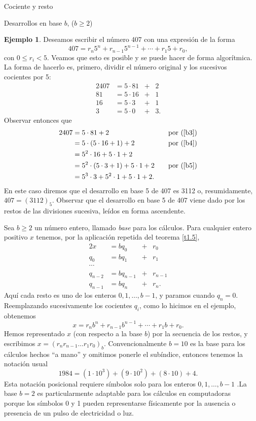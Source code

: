 \documentclass[11pt,spanish,makeidx]{amsbook}
\theoremstyle{definition}
\newtheorem{ejemplo}{Ejemplo}[section]
\theoremstyle{remark}
\begin{document}
\begin{section}{Cociente y resto}
\begin{subsection}{Desarrollos en base $b$, ($b \ge 2$)}
\begin{ejemplo} Deseamos escribir el número 407 con una expresión de la forma 
$$
407 = r_n5^n +r_{n-1} 5^{n-1}+\cdots + r_1 5 + r_0,
$$
con $0 \le r_i < 5$. Veamos que esto es posible y se puede hacer de forma algorítmica. La forma de hacerlo  es, primero, dividir el número original y los sucesivos cocientes por 5:  
\begin{alignat}2
407 &=5\cdot 81 &+& 2 \label{b3}\\
81 & = 5\cdot 16 &+& 1  \label{b4}\\
16 & = 5\cdot 3 &+& 1  \label{b5}\\
3 & = 5\cdot 0 &+& 3.
\end{alignat}
Observar entonces que
\begin{alignat*}2
407 &=5\cdot 81 + 2  &\quad& \text{por (\ref{b3})}\\
 &= 5\cdot (5\cdot 16 + 1) + 2  &\quad& \text{por (\ref{b4})}\\
 &= 5^2 \cdot 16+ 5\cdot 1 + 2 &\quad& \text{}\\
 &= 5^2 \cdot (5\cdot 3 + 1)+ 5\cdot 1 + 2   &\quad& \text{por (\ref{b5})}\\
 &= 5^3 \cdot 3+ 5^2 \cdot 1 + 5\cdot 1 + 2.  &\quad& \text{}
\end{alignat*}
En este caso diremos que el desarrollo en base 5 de 407 es 3112 o, resumidamente, $407 = (3112)_5$.  Observar que el desarrollo en base 5 de 407 viene dado por los restos de las divisiones sucesiva, leídos en forma ascendente.
\end{ejemplo}

Sea $b \ge 2$ un número entero, llamado {\em base} para los cálculos. Para cualquier entero positivo $x$ tenemos, por la aplicación repetida del teorema \ref{t1.5},
\begin{alignat*}2
x&=bq_0 &+& r_0 \\
q_0 & = bq_1 &+&r_1 \\
\cdots & \\
q_{n-2} & = bq_{n-1} &+&r_{n-1} \\
q_{n-1} & = bq_n &+&r_n.
\end{alignat*}
Aquí cada resto es uno de los enteros $0, 1,\ldots,b-1$, y paramos cuando $q_n=0$. Reemplazando sucesivamente los cocientes $q_i$, como lo hicimos en el ejemplo, obtenemos
$$
x=r_nb^n +r_{n-1} b^{n-1}+\cdots + r_1 b + r_0.
$$
Hemos representado $x$ (con respecto a la base $b$) por la secuencia de los restos, y escribimos $x=(r_nr_{n-1}\dots r_1 r_0)_b$. Convencionalmente $b=10$ es la base para los cálculos hechos ``a mano'' y omitimos ponerle el subíndice, entonces tenemos la notación usual
$$
1984=(1\cdot 10^3 ) + (9\cdot 10^2 )+(8\cdot 10 ) + 4.
$$
Esta notación posicional requiere símbolos solo para los enteros $0, 1,\ldots,b-1$ .La base $b=2$ es particularmente adaptable para los cálculos en computadoras porque los símbolos 0 y 1 pueden representarse físicamente por la ausencia o presencia de un pulso de electricidad o luz. 


\end{subsection}
\end{section}
\end{document}
